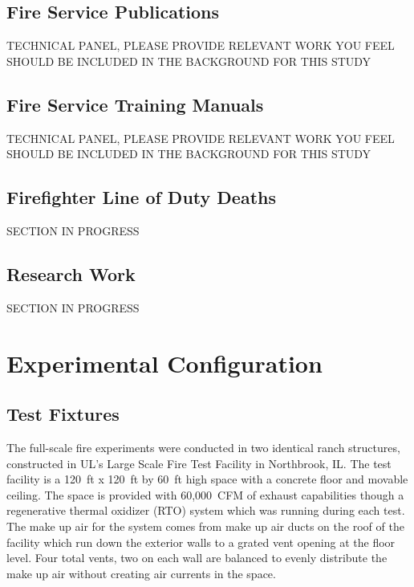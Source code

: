 \documentclass[12pt,oneside]{book}
\begin{document}
\section{Fire Service Publications}

TECHNICAL PANEL, PLEASE PROVIDE RELEVANT WORK YOU FEEL SHOULD BE INCLUDED IN THE BACKGROUND FOR THIS STUDY

\section{Fire Service Training Manuals}

TECHNICAL PANEL, PLEASE PROVIDE RELEVANT WORK YOU FEEL SHOULD BE INCLUDED IN THE BACKGROUND FOR THIS STUDY

\section{Firefighter Line of Duty Deaths}

SECTION IN PROGRESS

\section{Research Work}

SECTION IN PROGRESS

\clearpage

\chapter{Experimental Configuration}
\label{chap:exp_config}

\section{Test Fixtures}

The full-scale fire experiments were conducted in two identical ranch structures, constructed in UL's Large Scale Fire Test Facility in Northbrook, IL. The test facility is a 120~ft x 120~ft by 60~ft high space with a concrete floor and movable ceiling. The space is provided with 60,000~CFM of exhaust capabilities though a regenerative thermal oxidizer (RTO) system which was running during each test. The make up air for the system comes from make up air ducts on the roof of the facility which run down the exterior walls to a grated vent opening at the floor level. Four total vents, two on each wall are balanced to evenly distribute the make up air without creating air currents in the space. 
\end{document}
